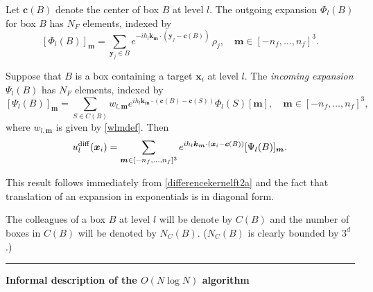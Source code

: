 \documentclass[final,letterpaper]{siamart171218}
\newcommand{\be}{\begin{equation}}
\newcommand{\ee}{\end{equation}}
\newcommand{\x}{\boldsymbol{x}}
\newcommand{\y}{\boldsymbol{y}}
\newcommand{\bc}{\boldsymbol{c}}
\newcommand{\bk}{\boldsymbol{k}}
\newcommand{\bm}{\boldsymbol{m}}
\begin{document}
\begin{definition}
Let $\bc(B)$ denote the center of box $B$ at level $l$. The outgoing expansion
$\Phi_l(B)$ for box $B$ has $N_F$ elements, indexed by 
\be\label{outgoingexpansion}
[\Phi_{l}(B)]_{\bm}=\sum_{\y_j\in B} e^{-ih_l\bk_{\bm}\cdot (\y_j-\bc(B))} \, \rho_j, 
\quad {\bm} \in [-n_f,\dots,n_f]^3.
\ee
\end{definition}

\begin{lemma} 
Suppose that $B$ is a box containing a target $\x_i$ at level $l$.
The {\em incoming expansion} $\Psi_{l}(B)$ has $N_F$ elements, indexed by 
\be\label{diagonaltranslation}
[\Psi_{l}(B)]_{\bm}=\sum_{S\in C(B)}w_{l,{\bm}}e^{ih_l\bk_{\bm}\cdot (\bc(B)-\bc(S))}
\Phi_{l}(S)[\bm],
\quad \bm \in [-n_f,\dots,n_f]^3,
\ee
where $w_{l,\bm}$ is given by \eqref{wlmdef}.
Then
\be\label{incomingexpansion}
u_{l}^{\rm diff}(\x_i)=
\sum_{\bm \in [-n_f,\dots,n_f]^3} 
e^{ih_l\bk_{\bm} \cdot (\x_i-\bc(B))}[\Psi_{l}(B)]_{\bm}. 
\ee
\end{lemma}

This result follows immediately from 
\eqref{differencekernelft2a} and the fact that translation of an expansion in
exponentials is in diagonal form. 

\begin{definition}
The colleagues of a box $B$ at level $l$ will be denote by 
$C(B)$ and the number of boxes in $C(B)$ will be denoted by
$N_C(B)$. ($N_C(B)$ is clearly bounded by $3^d$.) 
\end{definition}

\vspace{.2in}
\hrule
\vspace{.2in}

\begin{center}
{\bf Informal description of the $O(N \log N)$ algorithm}
\end{center}

\vspace{.1in}
\end{document}
